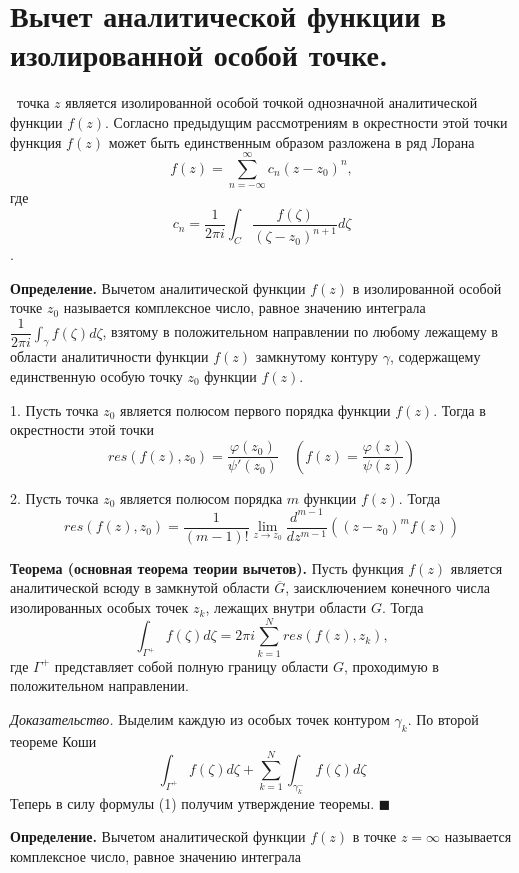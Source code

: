 \documentclass[9pt]{article}
\begin{document}
\section{Вычет аналитической функции в изолированной особой точке.}

\ 
 точка \(z\) является изолированной особой точкой однозначной аналитической функции \(f(z)\). Согласно предыдущим рассмотрениям в окрестности этой точки функция \(f(z)\) может быть единственным образом разложена в ряд Лорана
\[f(z)=\displaystyle\sum_{n=-\infty}^\infty c_n(z-z_0)^n,\]
где
\[c_n=\dfrac{1}{2\pi i}\int_C\dfrac{f(\zeta)}{(\zeta-z_0)^{n+1}}d\zeta\].
\par\textbf{Определение.} Вычетом аналитической функции \(f(z)\) в изолированной особой точке \(z_0\) называется комплексное число, равное значению интеграла \(\dfrac{1}{2\pi i}\int_\gamma f(\zeta)d\zeta\), взятому в положительном направлении по любому лежащему в области аналитичности функции \(f(z)\) замкнутому контуру \(\gamma\), содержащему единственную особую точку \(z_0\) функции \(f(z)\).
\par1. Пусть точка \(z_0\) является полюсом первого порядка функции \(f(z)\). Тогда в окрестности этой точки
\begin{equation}
    res(f(z),z_0)=\dfrac{\varphi(z_0)}{\psi'(z_0)}\quad\left(f(z)=\dfrac{\varphi(z)}{\psi(z)}\right)
\end{equation}
\par2. Пусть точка \(z_0\) является полюсом порядка \(m\) функции \(f(z)\). Тогда
\begin{equation}
    res(f(z),z_0)=\dfrac{1}{(m-1)!}\lim_{z\to z_0}\dfrac{d^{m-1}}{dz^{m-1}}((z-z_0)^mf(z))
\end{equation}
\par\textbf{Теорема (основная теорема теории вычетов).} Пусть функция \(f(z)\) является аналитической всюду в замкнутой области \(\overline{G}\), заисключением конечного числа изолированных особых точек \(z_k\), лежащих внутри области \(G\). Тогда
\begin{equation}
    \int_{\Gamma^+}f(\zeta)d\zeta=2\pi i\sum_{k=1}^N res(f(z),z_k),
\end{equation}
где \(\Gamma^+\) представляет собой полную границу области \(G\), проходимую в положительном направлении.
\par\textit{Доказательство.} Выделим каждую из особых точек контуром \(\gamma_k\). По второй теореме Коши
\[\int_{\Gamma^+}f(\zeta)d\zeta+\sum_{k=1}^N\int_{\gamma_k^-}f(\zeta)d\zeta\]
Теперь в силу формулы (1) получим утверждение теоремы. \(\blacksquare\)
\par\textbf{Определение.} Вычетом аналитической функции \(f(z)\) в точке \(z=\infty\) называется комплексное число, равное значению интеграла
\end{document}
